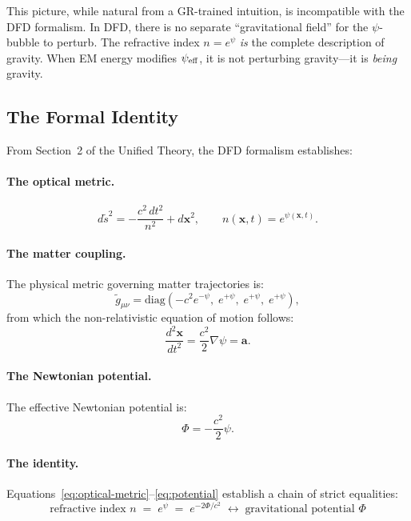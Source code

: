 \documentclass[11pt]{article}
\newcommand{\psifield}{\psi}
\newcommand{\avec}{\mathbf{a}}
\begin{document}
This picture, while natural from a GR-trained intuition, is incompatible
with the DFD formalism. In DFD, there is no separate ``gravitational
field'' for the $\psi$-bubble to perturb. The refractive index $n = e^\psi$
\emph{is} the complete description of gravity. When EM energy modifies
$\psi_{\rm eff}$, it is not perturbing gravity---it is \emph{being}
gravity.

\subsection{The Formal Identity}

From Section~2 of the Unified Theory, the DFD formalism establishes:

\paragraph{The optical metric.}
\begin{equation}\label{eq:optical-metric}
d\tilde{s}^2 = -\frac{c^2\,dt^2}{n^2} + d\mathbf{x}^2, \qquad
n(\mathbf{x},t) = e^{\psifield(\mathbf{x},t)}.
\end{equation}

\paragraph{The matter coupling.}
The physical metric governing matter trajectories is:
\begin{equation}\label{eq:physical-metric}
\tilde{g}_{\mu\nu} = \text{diag}\!\left(-c^2 e^{-\psi},\;
e^{+\psi},\; e^{+\psi},\; e^{+\psi}\right),
\end{equation}
from which the non-relativistic equation of motion follows:
\begin{equation}\label{eq:eom}
\frac{d^2\mathbf{x}}{dt^2} = \frac{c^2}{2}\nabla\psi = \avec.
\end{equation}

\paragraph{The Newtonian potential.}
The effective Newtonian potential is:
\begin{equation}\label{eq:potential}
\Phi = -\frac{c^2}{2}\psi.
\end{equation}

\paragraph{The identity.}
Equations~\eqref{eq:optical-metric}--\eqref{eq:potential} establish a
chain of strict equalities:
\begin{equation}\label{eq:chain}
\boxed{
\text{refractive index } n \;=\; e^\psi \;=\;
e^{-2\Phi/c^2} \;\longleftrightarrow\; \text{gravitational potential } \Phi
}
\end{equation}
\end{document}
